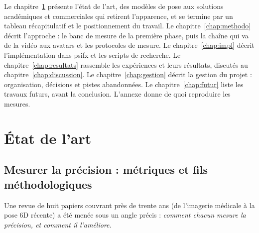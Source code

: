 \documentclass[11pt,a4paper]{report}
\begin{document}
Le chapitre~\ref{chap:sota} présente l'état de l'art, des modèles de pose aux solutions académiques et commerciales qui retirent
l'apparence, et se termine par un tableau récapitulatif et le positionnement du travail. Le chapitre~\ref{chap:methodo} décrit
l'approche : le banc de mesure de la première phase, puis la chaîne qui va de la vidéo aux avatars et les protocoles de mesure. Le
chapitre~\ref{chap:impl} décrit l'implémentation dans psifx et les scripts de recherche. Le chapitre~\ref{chap:resultats} rassemble
les expériences et leurs résultats, discutés au chapitre~\ref{chap:discussion}. Le chapitre~\ref{chap:gestion} décrit la gestion du
projet : organisation, décisions et pistes abandonnées. Le chapitre~\ref{chap:futur} liste les travaux futurs, avant la conclusion.
L'annexe donne de quoi reproduire les mesures.

\chapter{État de l'art}
\label{chap:sota}

\section{Mesurer la précision : métriques et fils méthodologiques}
\label{sec:sota-metriques}

Une revue de huit papiers couvrant près de trente ans (de l'imagerie médicale à la pose 6D récente) a été menée
sous un angle précis : \emph{comment chacun mesure la précision, et comment il l'améliore}.
\end{document}
